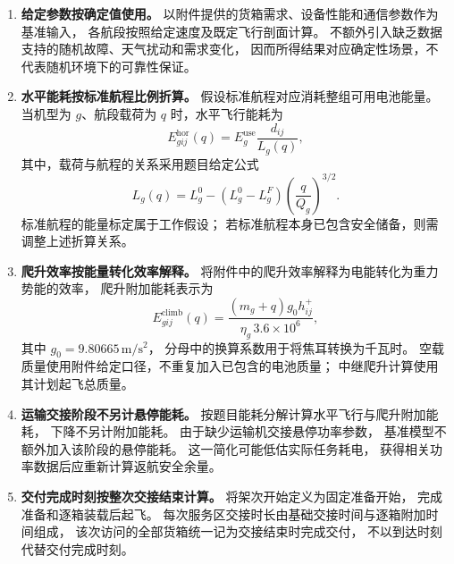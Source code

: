 \documentclass[bwprint]{gmcmthesis}
\begin{document}
\begin{enumerate}

    \item \textbf{给定参数按确定值使用。}
    以附件提供的货箱需求、设备性能和通信参数作为基准输入，
    各航段按照给定速度及既定飞行剖面计算。
    不额外引入缺乏数据支持的随机故障、天气扰动和需求变化，
    因而所得结果对应确定性场景，不代表随机环境下的可靠性保证。

    \item \textbf{水平能耗按标准航程比例折算。}
    假设标准航程对应消耗整组可用电池能量。
    当机型为 $g$、航段载荷为 $q$ 时，水平飞行能耗为
    \begin{equation}
        E^{\mathrm{hor}}_{gij}(q)
        =
        E_g^{\mathrm{use}}
        \frac{d_{ij}}{L_g(q)},
    \end{equation}
    其中，载荷与航程的关系采用题目给定公式
    \begin{equation}
        L_g(q)
        =
        L_g^{0}
        -
        \left(L_g^{0}-L_g^{F}\right)
        \left(\frac{q}{Q_g}\right)^{3/2}.
    \end{equation}
    标准航程的能量标定属于工作假设；
    若标准航程本身已包含安全储备，则需调整上述折算关系。

    \item \textbf{爬升效率按能量转化效率解释。}
    将附件中的爬升效率解释为电能转化为重力势能的效率，
    爬升附加能耗表示为
    \begin{equation}
        E^{\mathrm{climb}}_{gij}(q)
        =
        \frac{(m_g+q)g_0h_{ij}^{+}}
        {\eta_g\,3.6\times10^{6}},
    \end{equation}
    其中 $g_0=9.80665\,\mathrm{m/s^2}$，
    分母中的换算系数用于将焦耳转换为千瓦时。
    空载质量使用附件给定口径，不重复加入已包含的电池质量；
    中继爬升计算使用其计划起飞总质量。

    \item \textbf{运输交接阶段不另计悬停能耗。}
    按题目能耗分解计算水平飞行与爬升附加能耗，
    下降不另计附加能耗。
    由于缺少运输机交接悬停功率参数，
    基准模型不额外加入该阶段的悬停能耗。
    这一简化可能低估实际任务耗电，
    获得相关功率数据后应重新计算返航安全余量。

    \item \textbf{交付完成时刻按整次交接结束计算。}
    将架次开始定义为固定准备开始，
    完成准备和逐箱装载后起飞。
    每次服务区交接时长由基础交接时间与逐箱附加时间组成，
    该次访问的全部货箱统一记为交接结束时完成交付，
    不以到达时刻代替交付完成时刻。


\end{enumerate}
\end{document}
